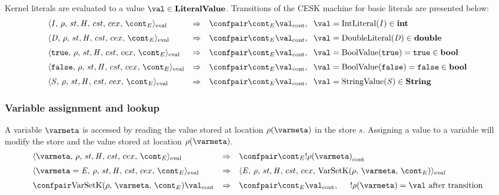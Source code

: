 \documentclass{article}
\begin{document}
Kernel literals are evaluated to a value $\val \in \dlitval$. Transitions of the CESK machine for basic literals are presented below:
\[
  \begin{array}{lcll}
	\cesktrans{
		\evalconf{\IntLiteral{\integermeta}}{\env}{\strace}{\cstrace}{\cex}{\econt}}{
		\contconf{\econt}{\val}},
	\hspace{2mm}\val = \mathrm{IntLiteral(\integermeta)} \in \mathbf{int}
	\\[2mm]

	\cesktrans{
		\evalconf{\DoubleLiteral{\doublemeta}}{\env}{\strace}{\cstrace}{\cex}{\econt}}{
		\contconf{\econt}{\val}},
	\hspace{2mm}\val = \mathrm{DoubleLiteral(\doublemeta)} \in \mathbf{double}
	\\[2mm]

	\cesktrans{
		\evalconf{\BoolLiteral{\tt{true}}}{\env}{\strace}{\cstrace}{\cex}{\econt}}{
		\contconf{\econt}{\val}},
	\hspace{2mm}\val = \mathrm{BoolValue(\tt{true})} = \tt{true}\in \mathbf{bool}
	\\[2mm]

	\cesktrans{
		\evalconf{\BoolLiteral{\tt{false}}}{\env}{\strace}{\cstrace}{\cex}{\econt}}{
		\contconf{\econt}{\val}},
	\hspace{2mm}\val = \mathrm{BoolValue(\tt{false})} = \tt{false}\in \mathbf{bool}
	\\[2mm]

	\cesktrans{
		\evalconf{\StringLiteral{\stringmeta}}{\env}{\strace}{\cstrace}{\cex}{\econt}}{
		\contconf{\econt}{\val}},
	\hspace{2mm}\val = \mathrm{StringValue(\stringmeta)} \in \mathbf{String}

  \end{array}
\]

\subsubsection{Variable assignment and lookup}
\label{subsubsec:variable-assignment-and-lookup}
A variable $\varmeta$ is accessed by reading the value stored at location $\env(\varmeta)$ in the store $s$. Assigning a value to a variable will modify the store and the value stored at location  $\env(\varmeta)$.
\newcommand{\VarSetK}[3]{\mathrm{VarSetK}({#1},\,{#2},\,{#3})}
\[
  \begin{array}{lcl}
	\cesktrans{
		\evalconf{\varmeta}{\env}{\strace}{\cstrace}{\cex}{\econt}}{
		\contconf{\econt}{\deref{\env(\varmeta)}}}
		\\[2mm]

	\cesktrans{
		\evalconf{\varmeta = \expr}{\env}{\strace}{\cstrace}{\cex}{\econt}}{
		\evalconf{\expr}{\env}{\strace}{\cstrace}{\cex}{\VarSetK{\env}{\varmeta}{\econt}}}
		\\[2mm]

	\cesktrans{
		\contconf{\VarSetK{\env}{\varmeta}{\econt}}{\val}}{
		\contconf{\econt}{\val}},
		\hspace{5mm} \deref{\env(\varmeta)} = \val
		\textrm{ after transition}
  \end{array}
\]
\end{document}
